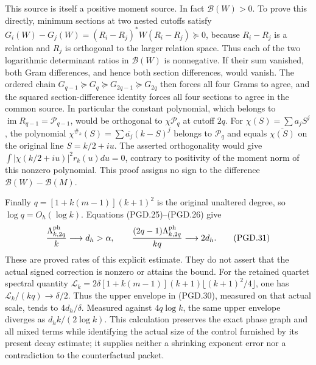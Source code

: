 This source is itself a positive moment source. In fact
\(\mathcal B(W)>0\). To prove this directly, minimum sections at
two nested cutoffs satisfy
\(G_i(W)-G_j(W)=(R_i-R_j)^*W(R_i-R_j)\succeq0\), because
\(R_i-R_j\) is a relation and \(R_j\) is orthogonal to the
larger relation space. Thus each of the two logarithmic determinant
ratios in \(\mathcal B(W)\) is nonnegative. If their sum vanished,
both Gram differences, and hence both section differences, would
vanish. The ordered chain
\(G_{q-1}\succeq G_q\succeq G_{2q-1}\succeq G_{2q}\)
then forces all four Grams to agree, and the squared section-difference
identity forces all four sections to agree in the common source.
In particular the constant polynomial, which belongs to
\(\operatorname{im}R_{q-1}=\mathcal P_{q-1}\), would be orthogonal
to \(\chi\mathcal P_q\) at cutoff \(2q\). For
\(\chi(S)=\sum a_jS^j\), the polynomial
\(\chi^{\#_k}(S)=\sum\overline{a_j}(k-S)^j\) belongs to
\(\mathcal P_q\) and equals \(\overline{\chi(S)}\) on the
original line \(S=k/2+iu\). The asserted orthogonality would give
\(\int|\chi(k/2+iu)|^2r_k(u)du=0\), contrary to positivity of
the moment norm of this nonzero polynomial. This proof assigns no
sign to the difference \(\mathcal B(W)-\mathcal B(M)\).

Finally \(q=[1+k(m-1)](k+1)^2\) is the original unaltered degree,
so \(\log q=O_h(\log k)\). Equations (PGD.25)--(PGD.26) give
\[
 \frac{\Lambda_{k,2q}^{\rm ph}}{k}\longrightarrow d_h>\alpha,
 \qquad
 \frac{(2q-1)\Lambda_{k,2q}^{\rm ph}}{kq}
                                  \longrightarrow2d_h.
 \tag{PGD.31}\label{GraphV2:eq:pgd-amplified-rate}
\]
These are proved rates of this explicit estimate. They do not assert
that the actual signed correction is nonzero or attains the bound.
For the retained quartet spectral quantity
\(\mathcal L_k=2\delta[1+k(m-1)](k+1)
                 \lfloor(k+1)^2/4\rfloor\), one has
\(\mathcal L_k/(kq)\to\delta/2\). Thus the upper envelope in
(PGD.30), measured on that actual scale, tends to \(4d_h/\delta\).
Measured against \(4q\log k\), the same upper envelope diverges
as \(d_hk/(2\log k)\). This calculation preserves the exact
phase graph and all mixed terms while identifying the actual size of
the control furnished by its present decay estimate; it supplies
neither a shrinking exponent error nor a contradiction to the
counterfactual packet.
